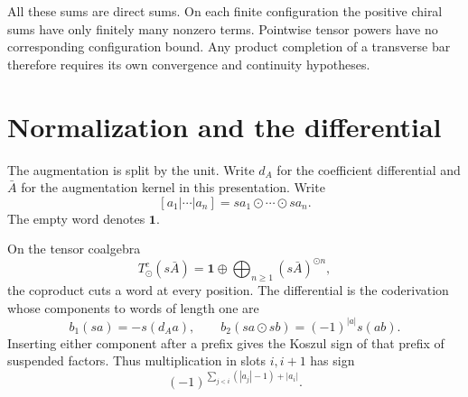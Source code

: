 All these sums are direct sums. On each finite configuration the positive chiral sums have only finitely many nonzero terms. Pointwise tensor powers have no corresponding configuration bound. Any product completion of a transverse bar therefore requires its own convergence and continuity hypotheses.

\section{Normalization and the differential}
The augmentation is split by the unit. Write $d_A$ for the coefficient differential and $\bar A$ for the augmentation kernel in this presentation. Write
\[
 [a_1|\cdots|a_n]=sa_1\odot\cdots\odot sa_n.
\]
The empty word denotes $\mathbf1$.

On the tensor coalgebra
\[
 T^c_\odot(s\bar A)=\mathbf1\oplus\bigoplus_{n\geq1}(s\bar A)^{\odot n},
\]
the coproduct cuts a word at every position. The differential is the coderivation whose components to words of length one are
\begin{equation}\label{cbc:bars:components}
 b_1(sa)=-s(d_Aa),\qquad
 b_2(sa\odot sb)=(-1)^{|a|}s(ab).
\end{equation}
Inserting either component after a prefix gives the Koszul sign of that prefix of suspended factors. Thus multiplication in slots $i,i+1$ has sign
\[
 (-1)^{\sum_{j<i}(|a_j|-1)+|a_i|}.
\]

